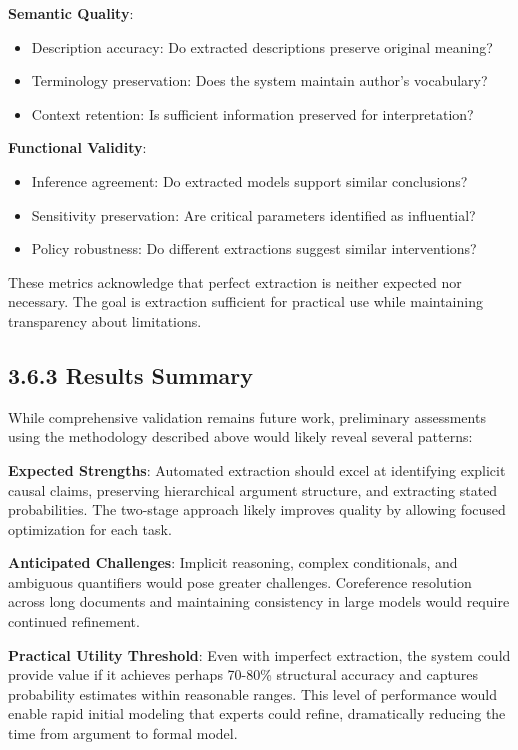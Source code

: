 \documentclass[
  11pt,
  letterpaper,
]{book}
\providecommand{\tightlist}{%
  \setlength{\itemsep}{0pt}\setlength{\parskip}{0pt}}
\begin{document}
\textbf{Semantic Quality}:

\begin{itemize}
\tightlist
\item
  Description accuracy: Do extracted descriptions preserve original
  meaning?
\item
  Terminology preservation: Does the system maintain author's
  vocabulary?
\item
  Context retention: Is sufficient information preserved for
  interpretation?
\end{itemize}

\textbf{Functional Validity}:

\begin{itemize}
\tightlist
\item
  Inference agreement: Do extracted models support similar conclusions?
\item
  Sensitivity preservation: Are critical parameters identified as
  influential?
\item
  Policy robustness: Do different extractions suggest similar
  interventions?
\end{itemize}

These metrics acknowledge that perfect extraction is neither expected
nor necessary. The goal is extraction sufficient for practical use while
maintaining transparency about limitations.

\subsection{3.6.3 Results Summary}\label{sec-validation-results}

While comprehensive validation remains future work, preliminary
assessments using the methodology described above would likely reveal
several patterns:

\textbf{Expected Strengths}: Automated extraction should excel at
identifying explicit causal claims, preserving hierarchical argument
structure, and extracting stated probabilities. The two-stage approach
likely improves quality by allowing focused optimization for each task.

\textbf{Anticipated Challenges}: Implicit reasoning, complex
conditionals, and ambiguous quantifiers would pose greater challenges.
Coreference resolution across long documents and maintaining consistency
in large models would require continued refinement.

\textbf{Practical Utility Threshold}: Even with imperfect extraction,
the system could provide value if it achieves perhaps 70-80\% structural
accuracy and captures probability estimates within reasonable ranges.
This level of performance would enable rapid initial modeling that
experts could refine, dramatically reducing the time from argument to
formal model.
\end{document}
